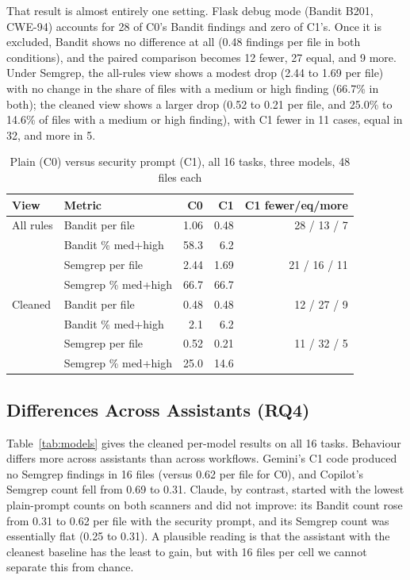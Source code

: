 \documentclass[conference]{IEEEtran}
\begin{document}
That result is almost entirely one setting. Flask debug mode (Bandit B201, CWE-94) accounts for 28 of C0's Bandit findings and zero of C1's. Once it is excluded, Bandit shows no difference at all (0.48 findings per file in both conditions), and the paired comparison becomes 12 fewer, 27 equal, and 9 more. Under Semgrep, the all-rules view shows a modest drop (2.44 to 1.69 per file) with no change in the share of files with a medium or high finding (66.7\% in both); the cleaned view shows a larger drop (0.52 to 0.21 per file, and 25.0\% to 14.6\% of files with a medium or high finding), with C1 fewer in 11 cases, equal in 32, and more in 5.

\begin{table}[t]
\caption{Plain (C0) versus security prompt (C1), all 16 tasks, three models, 48 files each}
\label{tab:sixteen}
\centering
\footnotesize
\begin{tabular}{@{}llrrr@{}}
\toprule
View & Metric & C0 & C1 & C1 fewer/eq/more \\
\midrule
All rules & Bandit per file & 1.06 & 0.48 & 28 / 13 / 7 \\
 & Bandit \% med+high & 58.3 & 6.2 & \\
 & Semgrep per file & 2.44 & 1.69 & 21 / 16 / 11 \\
 & Semgrep \% med+high & 66.7 & 66.7 & \\
\midrule
Cleaned & Bandit per file & 0.48 & 0.48 & 12 / 27 / 9 \\
 & Bandit \% med+high & 2.1 & 6.2 & \\
 & Semgrep per file & 0.52 & 0.21 & 11 / 32 / 5 \\
 & Semgrep \% med+high & 25.0 & 14.6 & \\
\bottomrule
\end{tabular}
\end{table}

\subsection{Differences Across Assistants (RQ4)}
Table~\ref{tab:models} gives the cleaned per-model results on all 16 tasks. Behaviour differs more across assistants than across workflows. Gemini's C1 code produced no Semgrep findings in 16 files (versus 0.62 per file for C0), and Copilot's Semgrep count fell from 0.69 to 0.31. Claude, by contrast, started with the lowest plain-prompt counts on both scanners and did not improve: its Bandit count rose from 0.31 to 0.62 per file with the security prompt, and its Semgrep count was essentially flat (0.25 to 0.31). A plausible reading is that the assistant with the cleanest baseline has the least to gain, but with 16 files per cell we cannot separate this from chance.
\end{document}
